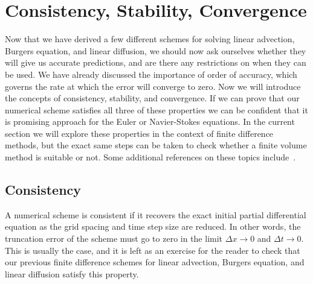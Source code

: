 \chapter{Consistency, Stability, Convergence}
Now that we have derived a few different schemes for solving linear advection, Burgers equation, and linear diffusion, we should now ask ourselves whether they will give us accurate predictions, and are there any restrictions on when they can be used. We have already discussed the importance of order of accuracy, which governs the rate at which the error will converge to zero. Now we will introduce the concepts of consistency, stability, and convergence. If we can prove that our numerical scheme satisfies all three of these properties we can be confident that it is promising approach for the Euler or Navier-Stokes equations. In the current section we will explore these properties in the context of finite difference methods, but the exact same steps can be taken to check whether a finite volume method is suitable or not. Some additional references on these topics include~\cite{hirschNumericalComputationInternal2007a,andersonComputationalFluidMechanics2016}.

\section{Consistency}
A numerical scheme is consistent if it recovers the exact initial partial differential equation as the grid spacing and time step size are reduced. In other words, the truncation error of the scheme must go to zero in the limit $\Delta x \rightarrow 0$ and $\Delta t \rightarrow 0$. This is usually the case, and it is left as an exercise for the reader to check that our previous finite difference schemes for linear advection, Burgers equation, and linear diffusion satisfy this property. 

